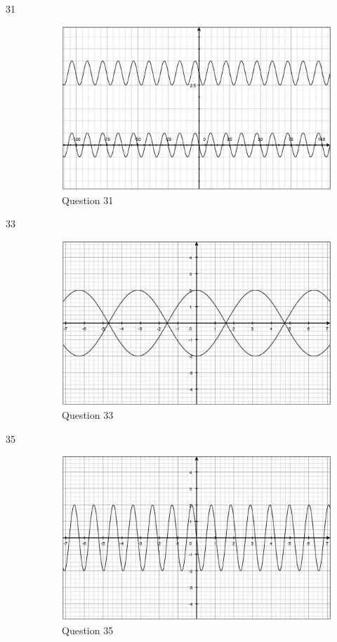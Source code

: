 \documentclass[fleqn,addpoints]{exam}
\begin{document}
\begin{description}
\item[31]
\begin{figure}[H]
  \centering
  \includegraphics[scale=.3]{question31.eps}
  \caption*{Question 31}
\end{figure}

\item[33]
\begin{figure}[H]
  \centering
  \includegraphics[scale=.3]{question33.eps}
  \caption*{Question 33}
\end{figure}

\item[35]
\begin{figure}[H]
  \centering
  \includegraphics[scale=.3]{question35.eps}
  \caption*{Question 35}
\end{figure}


\end{description}
\end{document}
